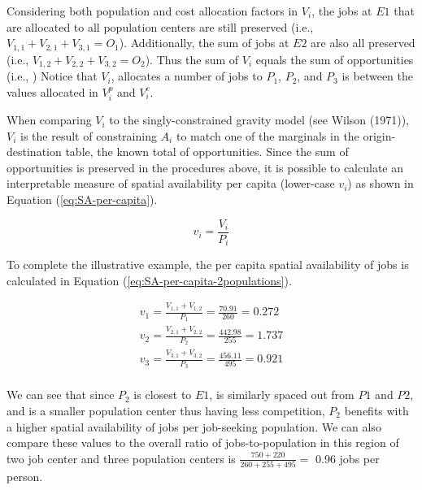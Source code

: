 \documentclass[]{elsarticle} %
\begin{document}
Considering both population and cost allocation factors in \(V_{i}\),
the jobs at \(E1\) that are allocated to all population centers are
still preserved (i.e., \(V_{1,1} + V_{2,1} + V_{3,1} = O_1\)).
Additionally, the sum of jobs at \(E2\) are also all preserved (i.e.,
\(V_{1,2} + V_{2,2} + V_{3,2} = O_2\)). Thus the sum of \(V_{i}\) equals
the sum of opportunities (i.e., ) Notice that \(V_{i}\), allocates a
number of jobs to \(P_1\), \(P_2\), and \(P_3\) is between the values
allocated in \(V^p_{i}\) and \(V^c_{i}\).

When comparing \(V_i\) to the singly-constrained gravity model (see
Wilson (1971)), \(V_i\) is the result of constraining \(A_i\) to match
one of the marginals in the origin-destination table, the known total of
opportunities. Since the sum of opportunities is preserved in the
procedures above, it is possible to calculate an interpretable measure
of spatial availability per capita (lower-case \(v_i\)) as shown in
Equation (\ref{eq:SA-per-capita}).

\begin{equation}
\label{eq:SA-per-capita}
v_i = \frac{V_i}{P_i}
\end{equation}

To complete the illustrative example, the per capita spatial
availability of jobs is calculated in Equation
(\ref{eq:SA-per-capita-2populations}).

\begin{equation}
\label{eq:SA-per-capita-2populations}
\begin{array}{l}
v_{1} = \frac{V_{1,1} + V_{1,2}}{P_1} =  \frac{70.91}{260} = 0.272\\
v_{2} =  \frac{V_{2,1} + V_{2,2}}{P_2} =  \frac{442.98}{255} = 1.737\\
v_{3} =  \frac{V_{3,1} + V_{3,2}}{P_3} =  \frac{456.11}{495} = 0.921\\
\end{array}
\end{equation}

We can see that since \(P_2\) is closest to \(E1\), is similarly spaced
out from \(P1\) and \(P2\), and is a smaller population center thus
having less competition, \(P_2\) benefits with a higher spatial
availability of jobs per job-seeking population. We can also compare
these values to the overall ratio of jobs-to-population in this region
of two job center and three population centers is
\(\frac{750+220}{260+255+495}=\) 0.96 jobs per person.
\end{document}
